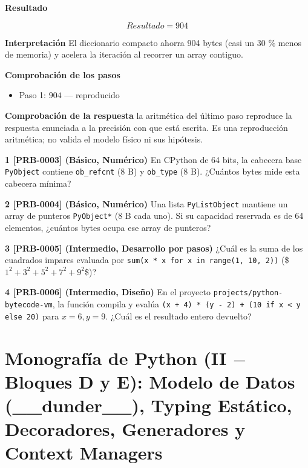 \documentclass{book}
\begin{document}
\begin{tcolorbox}[title={Problema resuelto}, studiumworked, breakable]
\noindent\textbf{Resultado}

\[
Resultado = 904
\]

\noindent\textbf{Interpretación}
El diccionario compacto ahorra 904 bytes (casi un 30 \% menos de memoria) y acelera la iteración al recorrer un array contiguo.

\noindent\textbf{Comprobación de los pasos}
\begin{itemize}
\item Paso 1: $904$ — reproducido
\end{itemize}

\noindent\textbf{Comprobación de la respuesta} la aritmética del último paso reproduce la respuesta enunciada a la precisión con que está escrita. Es una reproducción aritmética; no valida el modelo físico ni sus hipótesis.
\end{tcolorbox}

\begin{tcolorbox}[title={Ejercicios}, studiumworked, breakable]

\noindent\textbf{1 [PRB-0003] (Básico, Numérico)}
En CPython de 64 bits, la cabecera base \texttt{PyObject} contiene \texttt{ob\_refcnt} (8 B) y \texttt{ob\_type} (8 B). ¿Cuántos bytes mide esta cabecera mínima?

\noindent\textbf{2 [PRB-0004] (Básico, Numérico)}
Una lista \texttt{PyListObject} mantiene un array de punteros \texttt{PyObject*} (8 B cada uno). Si su capacidad reservada es de 64 elementos, ¿cuántos bytes ocupa ese array de punteros?

\noindent\textbf{3 [PRB-0005] (Intermedio, Desarrollo por pasos)}
¿Cuál es la suma de los cuadrados impares evaluada por \texttt{sum(x * x for x in range(1, 10, 2))} (\$\(1^2 + 3^2 + 5^2 + 7^2 + 9^2\)\$)?

\noindent\textbf{4 [PRB-0006] (Intermedio, Diseño)}
En el proyecto \texttt{projects/python-bytecode-vm}, la función compila y evalúa \texttt{(x + 4) * (y - 2) + (10 if x < y else 20)} para \(x = 6, y = 9\). ¿Cuál es el resultado entero devuelto?
\end{tcolorbox}

\chapter{Monografía de Python (II \(-\) Bloques D y E): Modelo de Datos (\_\_dunder\_\_), Typing Estático, Decoradores, Generadores y Context Managers}
\label{chap:cap02-python-intermedio-avanzado-modelo-datos-tipado-iteradores}
\end{document}
